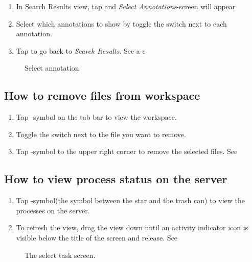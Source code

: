 \begin{enumerate}
\item In Search Results view, tap  and \emph{Select Annotations}-screen will appear
\item Select which annotations to show by toggle the switch next to each annotation.
\item Tap  to go back to \emph{Search Results}. See a-c
\end{enumerate}

\begin{figure}[ht]
\caption{Select annotation}
\label{fig:ios_searchResult}
\end{figure}
\FloatBarrier

\subsection{How to remove files from workspace}
\begin{enumerate}
\item Tap -symbol on the tab bar to view the workspace.
\item Toggle the switch next to the file you want to remove.
\item Tap -symbol to the upper right corner to remove the selected files. See 
\end{enumerate}

\subsection{How to view process status on the server}

\begin{enumerate}
\item Tap -symbol(the symbol between the star and the trash can) to view the processes on the server.
\item To refresh the view, drag the view down until an activity indicator icon is visible below the title of the screen and release. See 
\end{enumerate}

\begin{figure}[htb]
\caption{The select task screen.}
\label{fig:ios_processes}
\end{figure}
\FloatBarrier


